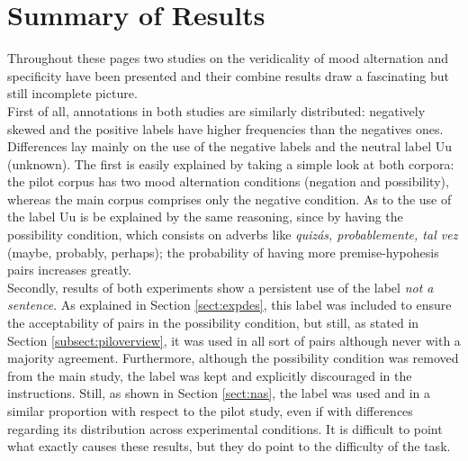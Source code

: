 \label{chap:con}
\section{Summary of Results}
Throughout these pages two studies on the veridicality of mood alternation and specificity have been presented and their combine results draw a fascinating but still incomplete picture.\\

First of all, annotations in both studies are similarly distributed: negatively skewed and the positive labels have higher frequencies than the negatives ones. Differences lay mainly on the use of the negative labels and the neutral label Uu (unknown). The first is easily explained by taking a simple look at both corpora: the pilot corpus has two mood alternation conditions (negation and possibility), whereas the main corpus comprises only the negative condition. As to the use of the label Uu is be explained by the same reasoning, since by having the possibility condition, which consists on adverbs like \textit{quizás, probablemente, tal vez} (maybe, probably, perhaps); the probability of having more premise-hypohesis pairs increases greatly.\\

Secondly, results of both experiments show a persistent use of the label \textit{not a sentence}. As explained in Section \ref{sect:expdes}, this label was included to ensure the acceptability of pairs in the possibility condition, but still, as stated in Section \ref{subsect:piloverview}, it was used in all sort of pairs although never with a majority agreement. Furthermore, although the possibility condition was removed from the main study, the label was kept and explicitly discouraged in the instructions. Still, as shown in Section \ref{sect:nas}, the label was used and in a similar proportion with respect to the pilot study, even if with differences regarding its distribution across experimental conditions. It is difficult to point what exactly causes these results, but they do point to the difficulty of the task.\\

